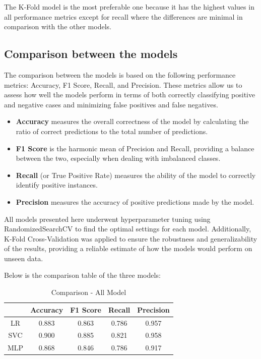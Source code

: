 The K-Fold model is the most preferable one because it has the highest values in all performance metrics except for recall where the differences are minimal in comparison with the other models.

\bigskip
\subsection{Comparison between the models}
The comparison between the models is based on the following performance metrics: Accuracy, F1 Score, Recall, and Precision. These metrics allow us to assess how well the models perform in terms of both correctly classifying positive and negative cases and minimizing false positives and false negatives.
\begin{itemize}
    \item \textbf{Accuracy} measures the overall correctness of the model by calculating the ratio of correct predictions to the total number of predictions.
    \item \textbf{F1 Score} is the harmonic mean of Precision and Recall, providing a balance between the two, especially when dealing with imbalanced classes.
    \item \textbf{Recall} (or True Positive Rate) measures the ability of the model to correctly identify positive instances.
    \item \textbf{Precision} measures the accuracy of positive predictions made by the model.
\end{itemize}

All models presented here underwent hyperparameter tuning using RandomizedSearchCV to find the optimal settings for each model. Additionally, K-Fold Cross-Validation was applied to ensure the robustness and generalizability of the results, providing a reliable estimate of how the models would perform on unseen data.

Below is the comparison table of the three models:

\begin{table}[H]
    \centering
    \caption{Comparison - All Model} 
    \begin{tabular}{||c| c c c c||} 
     \hline
     & Accuracy & F1 Score & Recall & Precision \\
     \hline\hline
     LR & 0.883 & 0.863 & 0.786 & 0.957 \\ 
     \hline
    SVC & 0.900 & 0.885 & 0.821 & 0.958  \\
    \hline
    MLP & 0.868 & 0.846 & 0.786 & 0.917 \\ 
    \hline
    \end{tabular}
    \label{tab:tab_Final}
\end{table}

